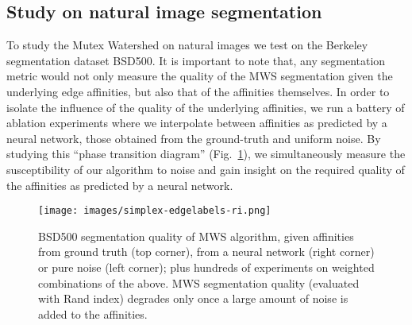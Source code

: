 
\subsection{Study on natural image segmentation}


To study the Mutex Watershed on natural images we test on the Berkeley segmentation dataset BSD500\cite{bsd}. 
It is important to note that, any segmentation metric would not only measure the quality of the MWS segmentation given the underlying edge affinities, but also that of the affinities themselves. 
In order to isolate the influence of the quality of the underlying affinities, we run a battery of ablation experiments where we interpolate between affinities as predicted by a neural network, those obtained from the ground-truth and uniform noise. By studying this ``phase transition diagram'' (Fig.~\ref{fig:simplex0}), we simultaneously measure the susceptibility of our algorithm to noise and gain insight on the required quality of the affinities as predicted by a neural network.\\

\begin{figure}
\centering
\texttt{[image: images/simplex-edgelabels-ri.png]}
\caption{\small 
BSD500 segmentation quality of MWS algorithm, given affinities from ground truth (top corner), from a neural network (right corner) or pure noise (left corner); plus hundreds of experiments on weighted combinations of the above. MWS segmentation quality (evaluated with Rand index) degrades only once a large amount of noise is added to the affinities.
\label{fig:simplex0}}
\end{figure}

